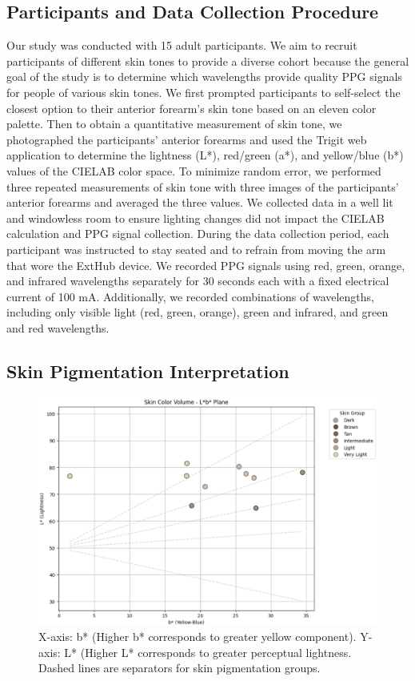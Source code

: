 \documentclass[letterpaper, 10 pt, conference]{ieeeconf}  %
\begin{document}
\subsection{Participants and Data Collection Procedure}
Our study was conducted with 15 adult participants. We aim to recruit participants of different skin tones to provide a diverse cohort because the general goal of the study is to determine which wavelengths provide quality PPG signals for people of various skin tones. We first prompted participants to self-select the closest option to their anterior forearm’s skin tone based on an eleven color palette. Then to obtain a quantitative measurement of skin tone, we photographed the participants’ anterior forearms and used the Trigit web application \cite{tjandra_trigit_2023} to determine the lightness (L*), red/green (a*), and yellow/blue (b*) values of the CIELAB color space. To minimize random error, we performed three repeated measurements of skin tone with three images of the participants’ anterior forearms and averaged the three values. We collected data in a well lit and windowless room to ensure lighting changes did not impact the CIELAB calculation and PPG signal collection. During the data collection period, each participant was instructed to stay seated and to refrain from moving the arm that wore the ExtHub device. We recorded PPG signals using red, green, orange, and infrared wavelengths separately for 30 seconds each with a fixed electrical current of 100 mA. Additionally, we recorded combinations of wavelengths, including only visible light (red, green, orange), green and infrared, and green and red wavelengths.

\subsection{Skin Pigmentation Interpretation}
\begin{figure}
    \centering
    \includegraphics[width=\linewidth]{images/skincolor.png}
    \caption{X-axis: b* (Higher b* corresponds to greater yellow component). Y-axis: L* (Higher L* corresponds to greater perceptual lightness. Dashed lines are separators for skin pigmentation groups.}
    \label{fig:skincolor}
\end{figure}
\end{document}
